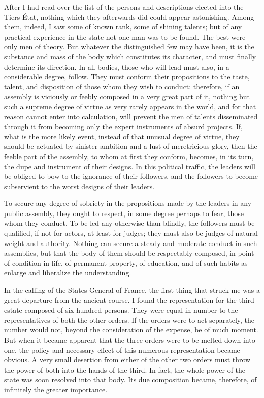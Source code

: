 After I had read over the list of the persons and descriptions elected into the Tiers État, nothing which they afterwards did could appear astonishing. Among them, indeed, I saw some of known rank, some of shining talents; but of any practical experience in the state not one man was to be found. The best were only men of theory. But whatever the distinguished few may have been, it is the substance and mass of the body which constitutes its character, and must finally determine its direction. In all bodies, those who will lead must also, in a considerable degree, follow. They must conform their propositions to the taste, talent, and disposition of those whom they wish to conduct: therefore, if an assembly is viciously or feebly composed in a very great part of it, nothing but such a supreme degree of virtue as very rarely appears in the world, and for that reason cannot enter into calculation, will prevent the men of talents disseminated through it from becoming only the expert instruments of absurd projects. If, what is the more likely event, instead of that unusual degree of virtue, they should be actuated by sinister ambition and a lust of meretricious glory, then the feeble part of the assembly, to whom at first they conform, becomes, in its turn, the dupe and instrument of their designs. In this political traffic, the leaders will be obliged to bow to the ignorance of their followers, and the followers to become subservient to the worst designs of their leaders.

To secure any degree of sobriety in the propositions made by the leaders in any public assembly, they ought to respect, in some degree perhaps to fear, those whom they conduct. To be led any otherwise than blindly, the followers must be qualified, if not for actors, at least for judges; they must also be judges of natural weight and authority. Nothing can secure a steady and moderate conduct in such assemblies, but that the body of them should be respectably composed, in point of condition in life, of permanent property, of education, and of such habits as enlarge and liberalize the understanding.

In the calling of the States-General of France, the first thing that struck me was a great departure from the ancient course. I found the representation for the third estate composed of six hundred persons. They were equal in number to the representatives of both the other orders. If the orders were to act separately, the number would not, beyond the consideration of the expense, be of much moment. But when it became apparent that the three orders were to be melted down into one, the policy and necessary effect of this numerous representation became obvious. A very small desertion from either of the other two orders must throw the power of both into the hands of the third. In fact, the whole power of the state was soon resolved into that body. Its due composition became, therefore, of infinitely the greater importance.

